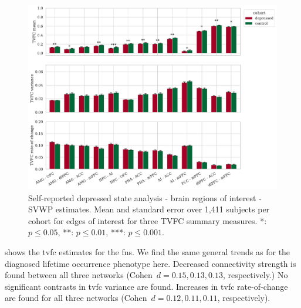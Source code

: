 \begin{figure}[h]
  \centering
  \includegraphics[width=\textwidth]{fig/ukbiobank/TVFC_predictions_summaries/self_reported_depression_state/cohort_comparison/ROI/correlation_all_TVFC_summary_measures_SVWP_joint_edges_of_interest}
  \caption{
    Self-reported depressed state analysis - brain regions of interest - SVWP estimates.
    Mean and standard error over 1,411 subjects per cohort for edges of interest for three TVFC summary measures.
    *: $p \leq 0.05$, **: $p \leq 0.01$, ***: $p \leq 0.001$.
  }
  \label{fig:ukb-results-srds-roi-cohort-comparison-edges-of-interest-wp}
\end{figure}


 shows the \gls{tvfc} estimates for the \glspl{fn}.
We find the same general trends as for the diagnosed lifetime occurrence phenotype here.
Decreased connectivity strength is found between all three networks (Cohen~$d = 0.15, 0.13, 0.13$, respectively.)
%
No significant contrasts in \gls{tvfc} variance are found.
Increases in \gls{tvfc} rate-of-change are found for all three networks (Cohen~$d = 0.12, 0.11, 0.11$, respectively).


